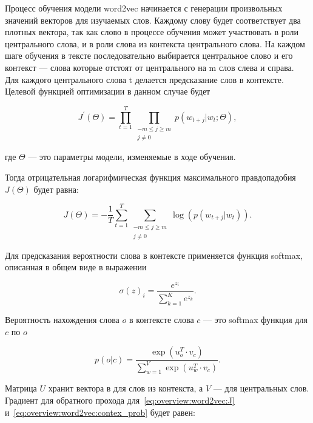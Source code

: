 Процесс обучения модели word2vec начинается с генерации произвольных значений векторов для изучаемых слов. Каждому слову будет соответствует два плотных вектора, так как слово в процессе обучения может участвовать в роли центрального слова, и в роли слова из контекста центрального слова. На каждом шаге обучения в тексте последовательно выбирается центральное слово и его контекст --- слова которые отстоят от центрального на m слов слева и справа. Для каждого центрального слова t делается предсказание слов в контексте. Целевой функцией оптимизации в данном случае будет

\begin{equation} \label{eq:overview:word2vec:Jprime}
  J^{\prime}(\Theta) = \prod_{t=1}^{T}\prod_{\substack{-m\leq j \geq m\\j \neq 0}}p(w_{t+j}|w_{t};\Theta),
\end{equation}
\begin{explanationx}
\item [где] $ \Theta $ --- это параметры модели, изменяемые в ходе обучения.
\end{explanationx}


Тогда отрицательная логарифмическая функция максимального правдопадобия $ J(\Theta) $ будет равна:

\begin{equation} \label{eq:overview:word2vec:J}
  J(\Theta) = -\frac{1}{T}\sum_{t=1}^{T}\sum_{\substack{-m\leq j \geq m\\j \neq 0}}\log(p(w_{t+j}|w_{t})).
\end{equation}

Для предсказания вероятности слова в контексте применяется функция softmax, описанная в общем виде в выражении

\begin{equation}
  \label{eq:overview:softmax}
  {\sigma(z)}_i = \frac{e^{z_i}}{\sum_{k=1}^{K}e^{z_k}}.
\end{equation}

Вероятность нахождения слова $o$ в контексте слова $c$ --- это softmax функция для $c$ по $o$

\begin{equation}
  \label{eq:overview:word2vec:contex_prob}
  p(o|c) = \frac{\exp({u_{o}^T}\cdot{v_{c}})}{\sum_{w=1}^{V}\exp({u_w^T}\cdot{v_{c}})}.
\end{equation}

Матрица $U$ хранит вектора в для слов из контекста, а $V$ --- для центральных слов.
Градиент для обратного прохода для~\ref{eq:overview:word2vec:J} и~\ref{eq:overview:word2vec:contex_prob} будет равен:

